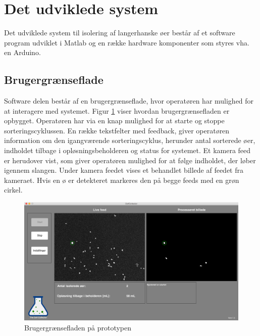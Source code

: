 \section{Det udviklede system}
Det udviklede system til isolering af langerhanske øer består af et software program udviklet i Matlab og en række hardware komponenter som styres vha. en Arduino.


 
\subsection{Brugergrænseflade} 
Software delen består af en brugergrænseflade, hvor operatøren har mulighed for at interagere med systemet. Figur \ref{fig:finalgui} viser hvordan brugergrænsefladen er opbygget. Operatøren har via en knap mulighed for at starte og stoppe sorteringscyklussen. En række tekstfelter med feedback,  giver operatøren information om den igangværende sorteringscyklus, herunder antal sorterede øer, indholdet tilbage i opløsningsbeholderen og status for systemet. Et kamera feed er herudover vist, som giver operatøren mulighed for at følge indholdet, der løber igennem slangen. Under kamera feedet vises et behandlet billede af feedet fra kameraet. Hvis en ø er detekteret markeres den på begge feeds med en grøn cirkel.

 \begin{figure}[H]
	\centering
	\includegraphics[width=1\textwidth]{billeder/gui_main.png}
	\caption{Brugergrænsefladen på prototypen}
	\label{fig:finalgui}
\end{figure}